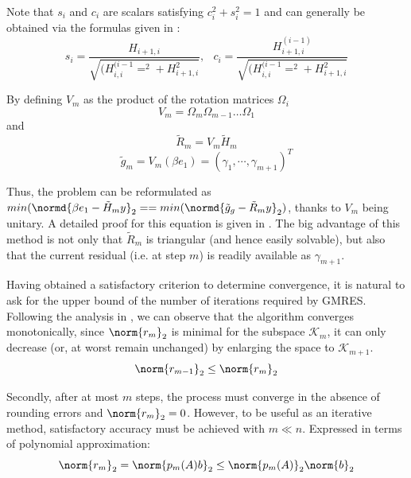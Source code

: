 \noindent Note that $s_i$ and $c_i$ are scalars satisfying $c^2_i+s^2_i=1$ and can generally be obtained via the formulas given in \cite{saad_iterative_2003}:
\begin{equation}
    s_i=\frac{H_{i+1, i}}{\sqrt{(H^{(i-1}_{i,i}=^2+H^2_{i+1, i}}}\text{,   } \;\;c_i=\frac{H^{(i-1)}_{i+1, i}}{\sqrt{(H^{(i-1}_{i,i}=^2+H^2_{i+1, i}}}
\end{equation}

\noindent By defining $V_m$ as the product of the rotation matrices $\Omega_i$
\begin{equation}
    V_m = \Omega_m \Omega_{m-1} \dots \Omega_1
\end{equation}
\noindent and
\begin{equation}
    \tilde{R}_m = V_m\tilde{H}_m 
\end{equation}
\begin{equation}
        \tilde{g}_m = V_m(\beta e_1) = (\gamma_1, \cdots, \gamma_{m+1})^T
\end{equation}

\noindent Thus, the problem can be reformulated as $min(\normd{\beta e_1 -\tilde{H}_my}_2==min(\normd{\tilde{g}_g -\tilde{R}_my}_2)$, thanks to $V_m$ being unitary. A detailed proof for this equation is given in \cite{saad_iterative_2003}. The big advantage of this method is not only that $\tilde{R}_m$ is triangular (and hence easily solvable), but also that the current residual (i.e. at step $m$) is readily available as $\gamma_{m+1}$.

Having obtained a satisfactory criterion to determine convergence, it is natural to ask for the upper bound of the number of iterations required by GMRES. Following the analysis in \cite{trefethen_numerical_1997}, we can observe that the algorithm converges monotonically, since $\norm{r_m}_2$ is minimal for the subspace $\mathcal{K}_m$, it can only decrease (or, at worst remain unchanged) by enlarging the space to $\mathcal{K}_{m+1}$.
\begin{equation}
    \norm{r_{m-1}}_2\leq \norm{r_m}_2
\end{equation}

\noindent Secondly, after at most $m$ steps, the process must converge in the absence of rounding errors and $\norm{r_m}_2 = 0$. However, to be useful as an iterative method, satisfactory accuracy must be achieved with  $m \ll n$. Expressed in terms of polynomial approximation: 
\begin{equation}
    \norm{r_m}_2=\norm{p_m(A)b}_2 \leq \norm{p_m(A)}_2\norm{b}_2
\end{equation}

